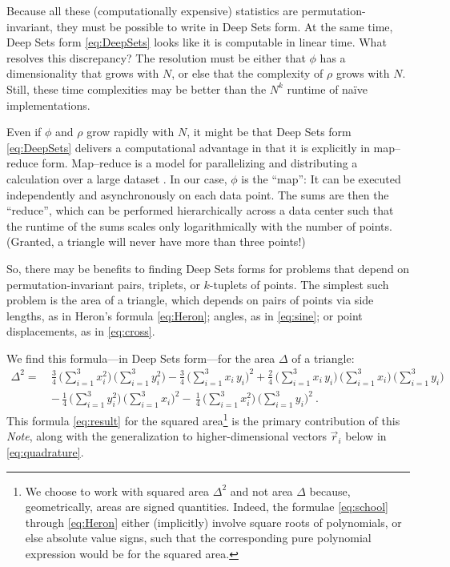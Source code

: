 \documentclass[10pt]{article}
\newcommand{\documentname}{\textsl{Note}}
\newcommand{\secbreak}{\bigskip{\centering\footnotesize $\triangle~~~\triangle~~~\triangle$\par}\bigskip\noindent}
\begin{document}
Because all these (computationally expensive) statistics are permutation-invariant, they must be possible to write in Deep Sets form.
At the same time, Deep Sets form \eqref{eq:DeepSets} looks like it is computable in linear time.
What resolves this discrepancy?
The resolution must be either that $\phi$ has a dimensionality that grows with $N$, or else that the complexity of $\rho$ grows with $N$.
Still, these time complexities may be better than the $N^k$ runtime of na\"ive implementations.

Even if $\phi$ and $\rho$ grow rapidly with $N$, it might be that Deep Sets form \eqref{eq:DeepSets} delivers a computational advantage in that it is explicitly in map--reduce form.
Map--reduce is a model for parallelizing and distributing a calculation over a large dataset \citep{DeanGhemawat2008,Lammel2008}.
In our case, $\phi$ is the ``map'':
It can be executed independently and asynchronously on each data point.
The sums are then the ``reduce'', which can be performed hierarchically across a data center such that the runtime of the sums scales only logarithmically with the number of points.
(Granted, a triangle will never have more than three points!)

So, there may be benefits to finding Deep Sets forms for problems that depend on permutation-invariant pairs, triplets, or $k$-tuplets of points.
The simplest such problem is the area of a triangle, which depends on pairs of points via
side lengths, as in Heron's formula \eqref{eq:Heron};
angles, as in \eqref{eq:sine};
or point displacements, as in \eqref{eq:cross}.

\secbreak
We find this formula---in Deep Sets form---for the area $\Delta$ of a triangle:
\begin{align}
    \Delta^2 = \ &
    \frac{3}{4} \, \big( \sum_{i=1}^{3} x_i^2 \big) \, \big( \sum_{i=1}^{3} y_i^2 \big)
    - \frac{3}{4} \, \big( \sum_{i=1}^{3} x_i \, y_i \big)^2 
    + \frac{2}{4} \, \big( \sum_{i=1}^{3} x_i \, y_i \big) \, \big( \sum_{i=1}^{3} x_i \big) \, \big( \sum_{i=1}^{3} y_i \big)
    \nonumber\\ &
    - \, \frac{1}{4} \, \big( \sum_{i=1}^{3} y_i^2 \big) \, \big( \sum_{i=1}^{3} x_i \big)^2
    - \, \frac{1}{4} \, \big( \sum_{i=1}^{3} x_i^2 \big) \, \big( \sum_{i=1}^{3} y_i \big)^2
     ~.
\label{eq:result}
\end{align}
This formula \eqref{eq:result} for the squared area\footnote{%
    We choose to work with squared area $\Delta^2$ and not area $\Delta$ because, geometrically, areas are signed quantities.
    Indeed, the formulae \eqref{eq:school} through \eqref{eq:Heron} either (implicitly) involve square roots of polynomials, or else absolute value signs, such that the corresponding pure polynomial expression would be for the squared area.}
is the primary contribution of this \documentname, along with the generalization to higher-dimensional vectors $\vec{r}_i$ below in \eqref{eq:quadrature}.
\end{document}
